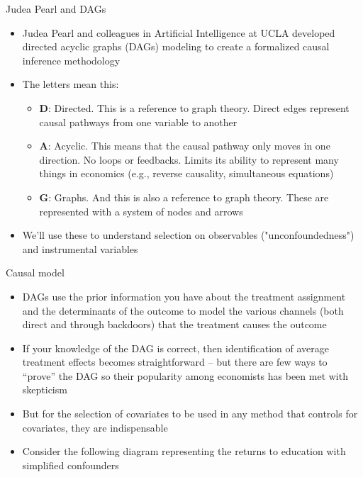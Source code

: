 \documentclass{beamer}
\begin{document}
\begin{frame}{Judea Pearl and DAGs}


  \begin{itemize}
    \item Judea Pearl and colleagues in Artificial Intelligence at UCLA developed directed acyclic graphs (DAGs) modeling to create a formalized causal inference methodology
    \item The letters mean this:
    	\begin{itemize}
	\item \textbf{D}: Directed.  This is a reference to graph theory.  Direct edges represent causal pathways from one variable to another
	\item \textbf{A}: Acyclic.  This means that the causal pathway only moves in one direction.  No loops or feedbacks. Limits its ability to represent many things in economics (e.g., reverse causality, simultaneous equations)
	\item \textbf{G}: Graphs. And this is also a reference to graph theory.  These are represented with a system of nodes and arrows
	\end{itemize}
    \item We'll use these to understand selection on observables ("unconfoundedness") and instrumental variables
  \end{itemize}

\end{frame}






\begin{frame}{Causal model}

  \begin{itemize}
  \item DAGs use the prior information you have about the treatment assignment and the determinants of the outcome to model the various channels (both direct and through backdoors) that the treatment causes the outcome
	\item If your knowledge of the DAG is correct, then identification of average treatment effects becomes straightforward -- but there are few ways to ``prove'' the DAG so their popularity among economists has been met with skepticism
	\item But for the selection of covariates to be used in any method that controls for covariates, they are indispensable 
    \item Consider the following diagram representing the returns to education with simplified confounders
  \end{itemize}

\end{frame}
\end{document}
